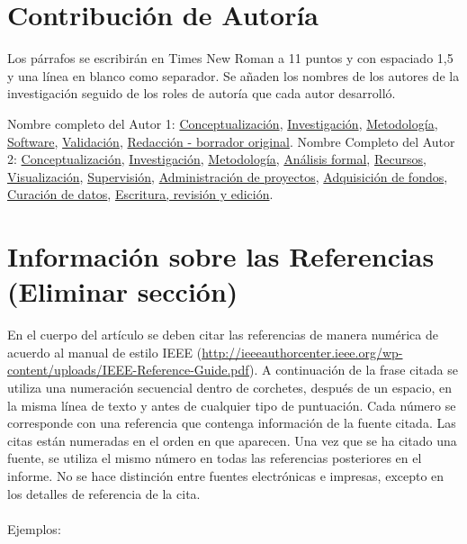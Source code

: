 \documentclass{innosoft}
\begin{document}
\section*{Contribuci\'on de Autor\'ia}
Los p\'arrafos se escribir\'an en Times New Roman a 11 puntos y con espaciado 1,5 y una l\'inea en blanco como separador. Se a\~naden los nombres de los autores de la investigaci\'on seguido de los roles de autor\'ia que cada autor desarroll\'o. 

Nombre completo del Autor 1: \href{http://credit.niso.org/contributor-roles/conceptualization/}{Conceptualizaci\'on}, \href{http://credit.niso.org/contributor-roles/investigation/}{Investigaci\'on}, \href{http://credit.niso.org/contributor-roles/methodology/}{Metodolog\'ia}, \href{http://credit.niso.org/contributor-roles/software/}{Software}, \href{http://credit.niso.org/contributor-roles/validation/}{Validaci\'on}, \href{http://credit.niso.org/contributor-roles/writing-original-draft/}{Redacci\'on - borrador original}. Nombre Completo del Autor 2: \href{http://credit.niso.org/contributor-roles/conceptualization/}{Conceptualizaci\'on}, \href{http://credit.niso.org/contributor-roles/investigation/}{Investigaci\'on}, \href{http://credit.niso.org/contributor-roles/methodology/}{Metodolog\'ia},  \href{http://credit.niso.org/contributor-roles/formal-analysis/}{An\'alisis formal},  \href{http://credit.niso.org/contributor-roles/resources/}{Recursos}, \href{http://credit.niso.org/contributor-roles/visualization/}{Visualizaci\'on}, \href{http://credit.niso.org/contributor-roles/supervision/}{Supervisi\'on}, \href{http://credit.niso.org/contributor-roles/project-administration/}{Administraci\'on de proyectos}, \href{http://credit.niso.org/contributor-roles/funding-acquisition/}{Adquisici\'on de fondos}, \href{http://credit.niso.org/contributor-roles/data-curation/}{Curaci\'on de datos}, \href{http://credit.niso.org/contributor-roles/writing-review-editing/}{Escritura, revisi\'on y edici\'on}.

\section*{Informaci\'on sobre las Referencias (Eliminar secci\'on)}

En el cuerpo del art\'iculo se deben citar las referencias de manera num\'erica de acuerdo al manual de estilo IEEE (\url{http://ieeeauthorcenter.ieee.org/wp-content/uploads/IEEE-Reference-Guide.pdf}). A continuaci\'on de la frase citada se utiliza una numeraci\'on secuencial dentro de corchetes, despu\'es de un espacio, en la misma l\'inea de texto y antes de cualquier tipo de puntuaci\'on. Cada n\'umero se corresponde con una referencia que contenga informaci\'on de la fuente citada. Las citas est\'an numeradas en el orden en que aparecen. Una vez que se ha citado una fuente, se utiliza el mismo n\'umero en todas las referencias posteriores en el informe. No se hace distinci\'on entre fuentes electr\'onicas e impresas, excepto en los detalles de referencia de la cita.\\\\
Ejemplos:
\end{document}
